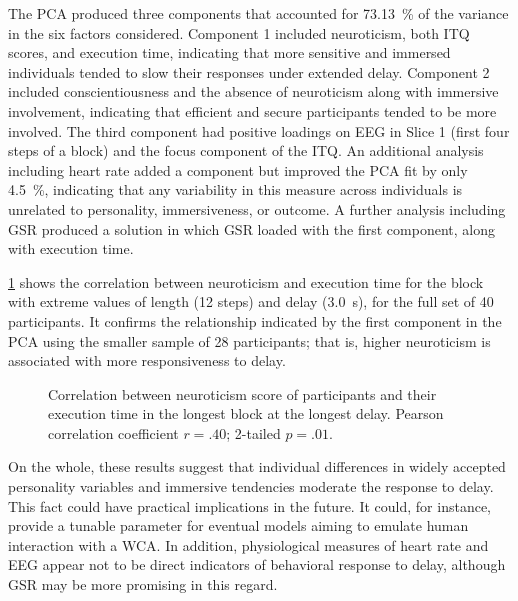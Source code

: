 \documentclass[10pt,letterpaper]{article}
\begin{document}
The PCA produced three components that accounted for \SI{73.13}{\percent} of the variance in the six factors considered.
Component 1 included neuroticism, both ITQ scores, and execution time, indicating that more sensitive and immersed individuals tended to slow their responses under extended delay.
Component 2 included conscientiousness and the absence of neuroticism along with immersive involvement, indicating that efficient and secure participants tended to be more involved.
The third component had positive loadings on EEG in Slice 1 (first four steps of a block) and the focus component of the ITQ.\@
An additional analysis including heart rate added a component but improved the PCA fit by only \SI{4.5}{\percent}, indicating that any variability in this measure across individuals is unrelated to personality, immersiveness, or outcome.
A further analysis including GSR produced a solution in which GSR loaded with the first component, along with execution time.

\cref{fig:neuro:exectime:reg} shows the correlation between neuroticism and execution time for the block with extreme values of length (12 steps) and delay (\SI{3.0}{\second}), for the full set of 40 participants.
It confirms the relationship indicated by the first component in the PCA using the smaller sample of 28 participants; that is, higher neuroticism is associated with more responsiveness to delay.

\begin{figure}[h]
    \centering
    \caption{Correlation between neuroticism score of participants and their execution time in the longest block at the longest delay.
    Pearson correlation coefficient \( r = .40 \); 2-tailed \( p = .01 \).}
    \label{fig:neuro:exectime:reg}
\end{figure}

On the whole, these results suggest that individual differences in widely accepted personality variables and immersive tendencies moderate the response to delay.
This fact could have practical implications in the future.
It could, for instance, provide a tunable parameter for eventual models aiming to emulate human interaction with a WCA.\@
In addition, physiological measures of heart rate and EEG appear not to be direct indicators of  behavioral response to delay, although GSR may be more promising in this regard.
\end{document}

